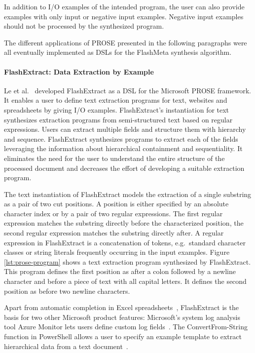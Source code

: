 \documentclass[\myrootdir/main.tex]{subfiles}
\begin{document}
In addition to I/O examples of the intended program, the user can also provide examples with only input or negative input examples.
Negative input examples should not be processed by the synthesized program.

The different applications of PROSE presented in the following paragraphs were all eventually implemented as DSLs for the FlashMeta synthesis algorithm.

\paragraph{FlashExtract: Data Extraction by Example}
Le et al.~\cite{le2014flashextract:} developed FlashExtract as a DSL for the Microsoft PROSE framework.
It enables a user to define text extraction programs for text, websites and spreadsheets by giving I/O examples.
FlashExtract's instantiation for text synthesizes extraction programs from semi-structured text based on regular expressions.
Users can extract multiple fields and structure them with hierarchy and sequence.
FlashExtract synthesizes programs to extract each of the fields leveraging the information about hierarchical containment and sequentiality.
It eliminates the need for the user to understand the entire structure of the processed document and decreases the effort of developing a suitable extraction program.

The text instantiation of FlashExtract models the extraction of a single substring as a pair of two cut positions.
A position is either specified by an absolute character index or by a pair of two regular expressions.
The first regular expression matches the substring directly before the characterized position, the second regular expression matches the substring directly after.
A regular expression in FlashExtract is a concatenation of tokens, e.g.\ standard character classes or string literals frequently occurring in the input examples.
Figure \ref{lst:prose-program} shows a text extraction program synthesized by FlashExtract.
This program defines the first position as after a colon followed by a newline character and before a piece of text with all capital letters.
It defines the second position as before two newline characters.

Apart from automatic completion in Excel spreadsheets~\cite{excel2019flashfill}, FlashExtract is the basis for two other Microsoft product features:
Microsoft's system log analysis tool Azure Monitor lets users define custom log fields~\cite{azure2019custom}.
The ConvertFrom-String function in PowerShell allows a user to specify an example template to extract hierarchical data from a text document~\cite{powershell2019convert}.
\end{document}
